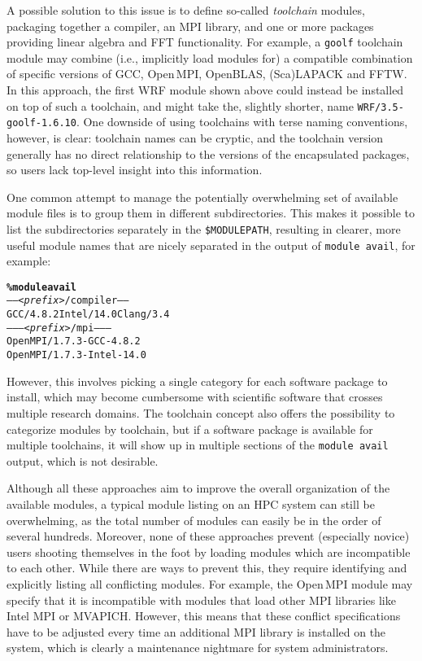 A possible solution to this issue is to define so-called \emph{toolchain}
modules, packaging together a compiler, an MPI library, and one or more packages
providing linear algebra and FFT functionality. For example, a \texttt{\small goolf}
toolchain module may combine (i.e., implicitly load modules for) a compatible combination of specific versions of GCC,
Open\,MPI, OpenBLAS, (Sca)LAPACK and FFTW. In this approach, the
first WRF module shown above could instead be installed on top of such a toolchain,
and might take the, slightly shorter, name \texttt{\small WRF/3.5-goolf-1.6.10}.
One downside of using toolchains with terse naming conventions, however, is clear: toolchain names can be cryptic, and the toolchain version generally has no direct relationship to the versions of the encapsulated packages, so users lack top-level insight into 
this information.

One common attempt to manage the potentially overwhelming set of available
module files is to group them in different subdirectories. This makes 
it possible to list the subdirectories separately in the
\texttt{\small\$MODULEPATH}, resulting in clearer, more useful
 module names that are
nicely separated in the output of
\texttt{\small module avail}, for example:
{\small
\begin{alltt}
    \textbf{\% module avail}
    ----- \emph{<prefix>}/compiler -----
    GCC/4.8.2   Intel/14.0  Clang/3.4
    -------- \emph{<prefix>}/mpi --------
    OpenMPI/1.7.3-GCC-4.8.2
    OpenMPI/1.7.3-Intel-14.0\
\end{alltt}
}
\noindent
However, this involves picking a single category for each software package to
install, which may become cumbersome with scientific software that crosses multiple
research domains. The toolchain concept also offers the possibility to categorize
modules by toolchain, but if a software package is available for multiple
toolchains, it will show up in multiple sections of the \texttt{\small module
avail} output, which is not desirable.


Although all these approaches aim to improve the overall
organization of the available modules, a typical module listing on an HPC
system can still be overwhelming, as the total number of modules can easily
be in the order of several hundreds. Moreover, none of these approaches prevent (especially novice) users shooting themselves in the
foot by loading modules which are incompatible to each other. While
there are ways to prevent this, they require identifying and explicitly listing
all conflicting modules. For example, the Open\,MPI module may
specify that it is incompatible with modules that load other MPI libraries like
Intel MPI or MVAPICH. However, this means that these conflict specifications have
to be adjusted every time an additional MPI library is installed on the
system, which is clearly a maintenance nightmare for system administrators.

